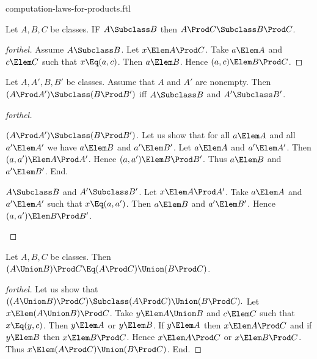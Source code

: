 \documentclass{stex}
\begin{document}
\begin{smodule}{computation-laws-for-products.ftl}


\begin{proposition*}[forthel]
  Let $A, B, C$ be classes.
  IF $A \Subclass B$ then $A \Prod C \Subclass B \Prod C$.
\end{proposition*}
\begin{proof}[forthel]
  Assume $A \Subclass B$.
  Let $x \Elem A \Prod C$.
  Take $a \Elem A$ and $c \Elem C$ such that $x \Eq (a, c)$.
  Then $a \Elem B$.
  Hence $(a, c) \Elem B \Prod C$.
\end{proof}

\begin{proposition*}[forthel]
  Let $A, A', B, B'$ be classes.
  Assume that $A$ and $A'$ are nonempty.
  Then $(A \Prod A') \Subclass (B \Prod B')$ iff $A \Subclass B$ and $A' \Subclass B'$.
\end{proposition*}
\begin{proof}[forthel]
  \begin{case}{$(A \Prod A') \Subclass (B \Prod B')$.}
    Let us show that for all $a \Elem A$ and all $a' \Elem A'$ we have $a \Elem B$ and $a' \Elem B'$.
      Let $a \Elem A$ and $a' \Elem A'$.
      Then $(a, a') \Elem A \Prod A'$.
      Hence $(a, a') \Elem B \Prod B'$.
      Thus $a \Elem B$ and $a' \Elem B'$.
    End.
  \end{case}

  \begin{case}{$A \Subclass B$ and $A' \Subclass B'$.}
    Let $x \Elem A \Prod A'$.
    Take $a \Elem A$ and $a' \Elem A'$ such that $x \Eq (a, a')$.
    Then $a \Elem B$ and $a' \Elem B'$.
    Hence $(a, a') \Elem B \Prod B'$.
  \end{case}
\end{proof}

\begin{proposition*}[forthel]
  Let $A, B, C$ be classes.
  Then $(A \Union B) \Prod C \Eq (A \Prod C) \Union (B \Prod C)$.
\end{proposition*}
\begin{proof}[forthel]
  Let us show that $((A \Union B) \Prod C) \Subclass (A \Prod C) \Union (B \Prod C).$ %
    Let $x \Elem (A \Union B) \Prod C$.
    Take $y \Elem A \Union B$ and $c \Elem C$ such that $x \Eq (y, c)$.
    Then $y \Elem A$ or $y \Elem B$.
    If $y \Elem A$ then $x \Elem A \Prod C$ and if $y \Elem B$ then $x \Elem B \Prod C$.
    Hence $x \Elem A \Prod C$ or $x \Elem B \Prod C$.
    Thus $x \Elem (A \Prod C) \Union (B \Prod C)$.
  End.


\end{proof}
\end{smodule}
\end{document}
